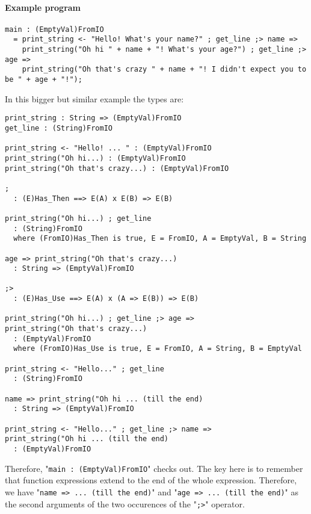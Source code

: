 \documentclass{article}
\begin{document}
\paragraph{Example program}
\begin{verbatim}
main : (EmptyVal)FromIO
  = print_string <- "Hello! What's your name?" ; get_line ;> name =>
    print_string("Oh hi " + name + "! What's your age?") ; get_line ;> age =>
    print_string("Oh that's crazy " + name + "! I didn't expect you to be " + age + "!");
\end{verbatim}
In this bigger but similar example the types are:
\begin{verbatim}
print_string : String => (EmptyVal)FromIO
get_line : (String)FromIO

print_string <- "Hello! ... " : (EmptyVal)FromIO
print_string("Oh hi...) : (EmptyVal)FromIO
print_string("Oh that's crazy...) : (EmptyVal)FromIO

;
  : (E)Has_Then ==> E(A) x E(B) => E(B) 

print_string("Oh hi...) ; get_line
  : (String)FromIO
  where (FromIO)Has_Then is true, E = FromIO, A = EmptyVal, B = String

age => print_string("Oh that's crazy...)
  : String => (EmptyVal)FromIO

;>
  : (E)Has_Use ==> E(A) x (A => E(B)) => E(B) 

print_string("Oh hi...) ; get_line ;> age =>
print_string("Oh that's crazy...)
  : (EmptyVal)FromIO
  where (FromIO)Has_Use is true, E = FromIO, A = String, B = EmptyVal

print_string <- "Hello..." ; get_line
  : (String)FromIO

name => print_string("Oh hi ... (till the end)
  : String => (EmptyVal)FromIO

print_string <- "Hello..." ; get_line ;> name =>
print_string("Oh hi ... (till the end)
  : (EmptyVal)FromIO
\end{verbatim}
Therefore, "\texttt{main\ :\ (EmptyVal)FromIO}" checks out.  The key here is
to remember that function expressions extend to the end of the whole
expression. Therefore, we have "\texttt{name => ... (till the end)}" and
"\texttt{age => ... (till the end)}" as the second arguments of the two
occurences of the "\texttt{;>}" operator. 
\end{document}
